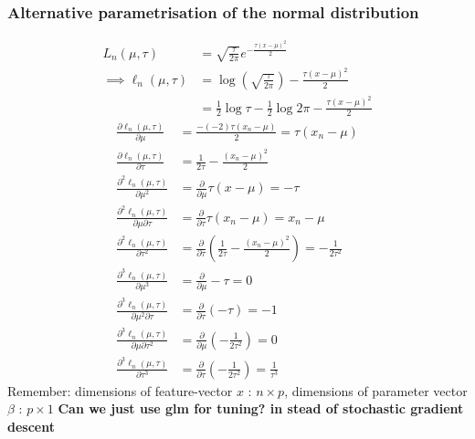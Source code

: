 \documentclass{article}
\begin{document}
\subsubsection{Alternative parametrisation of the normal distribution}
\begin{equation}\begin{split}
    L_n(\mu, \tau) &= \sqrt{\frac{\tau}{2\pi}}e^{-\frac{\tau\left(x - \mu\right)^2}{2}} \\
    \implies \ell_n(\mu, \tau) &= \log\left(\sqrt{\frac{\tau}{2\pi}}\right) - \frac{\tau\left(x - \mu\right)^2}{2}\\
    & = \frac{1}{2}\log \tau - \frac{1}{2} \log 2\pi - \frac{\tau\left(x - \mu\right)^2}{2}
\end{split}
\end{equation}
\begin{equation}
\begin{split}
    \frac{\partial \ell_n\left(\mu, \tau\right)}{\partial \mu} &= \frac{- 
    \left(-2\right)\tau\left(x_n - \mu\right)}{2} = \tau\left(x_n - \mu\right) \\
    \frac{\partial \ell_n\left(\mu, \tau\right)}{\partial \tau} &= \frac{1}{2\tau} - \frac{\left(x_n - \mu\right)^2}{2}\\
    \frac{\partial^2 \ell_n\left(\mu, \tau\right)}{\partial\mu^2} &= \frac{\partial}{\partial\mu} \tau\left(x - \mu\right) = -\tau \\
    \frac{\partial^2\ell_n\left(\mu,\tau\right)}{\partial\mu\partial\tau} &= \frac{\partial}{\partial \tau} \tau\left(x_n - \mu\right) = x_n - \mu \\
    \frac{\partial^2\ell_n\left(\mu, \tau\right)}{\partial \tau^2} &= \frac{\partial}{\partial\tau} \left(\frac{1}{2\tau} - \frac{\left(x_n - \mu\right)^2}{2}\right) = -\frac{1}{2\tau^2}\\
    \frac{\partial ^3 \ell_n\left(\mu, \tau\right)}{\partial \mu^3} &= \frac{\partial}{\partial \mu} -\tau = 0\\
    \frac{\partial^3 \ell_n\left(\mu, \tau\right)}{\partial \mu^2\partial\tau} &=\frac{\partial}{\partial \tau} \left(-\tau\right) = -1 \\
    \frac{\partial^3\ell_n\left(\mu, \tau\right)}{\partial\mu\partial\tau^2} &= \frac{\partial}{\partial\mu}\left(-\frac{1}{2\tau^2}\right) = 0 \\
    \frac{\partial^3\ell_n\left(\mu, \tau\right)}{\partial \tau^3} &= \frac{\partial}{\partial \tau} \left(-\frac{1}{2\tau^2}\right) = \frac{1}{\tau^3}
\end{split}
\end{equation}
Remember: dimensions of feature-vector $x$ : $n\times p $, dimensions of parameter vector $\beta$ : $p \times 1$ 
\textbf{Can we just use glm for tuning? in stead of stochastic gradient descent}
\end{document}
